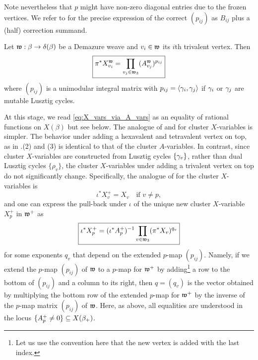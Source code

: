 \noindent Note nevertheless that $p$ might have non-zero diagonal entries due to the frozen vertices. We refer to \cite[Section 8.2]{CGGLSS25} for the precise expression of the correct $(p_{ij})$ as $B_{ij}$ plus a (half) correction summand. \\

\begin{lemma}\label{lem:X_vars_via_A_vars} Let $\mathfrak{w}:\beta\to\delta(\beta)$ be a Demazure weave and $v_i\in\mathfrak{w}$ its $i$th trivalent vertex. Then
\begin{equation}
\label{eq:X_vars_via_A_vars}
\boxed{\pi^*X^{\mathfrak{w}}_{v_i}= \prod_{v_j\in\mathfrak{w}_3} (A^{\mathfrak{w}}_{v_j}) ^{p_{ij}}}
\end{equation}
where $(p_{ij})$ is a unimodular integral matrix with $p_{ij}=\langle\gamma_i,\gamma_j\rangle$ if $\gamma_i$ or $\gamma_j$ are mutable Lusztig cycles.\sbs
\end{lemma}

\noindent At this stage, we read \eqref{eq:X_vars_via_A_vars} as an equality of rational functions on $X(\beta)$ but see  below. The analogue of  and  for cluster $X$-variables is simpler. The behavior under adding a hexavalent and tetravalent vertex on top, as in .(2) and (3) is identical to that of the cluster $A$-variables. In contrast, since cluster $X$-variables are constructed from Lusztig cycles $\{\gamma_v\}$, rather than dual Lusztig cycles $\{\rho_v\}$, the cluster $X$-variables under adding a trivalent vertex on top do not significantly change. Specifically, the analogue of  for the cluster $X$-variables is
\begin{equation}\label{eq:Xvariables_up_new_trivalent}
 \boxed{\iota^*X^+_v=X_v}\quad\mbox{if }v\neq p,
\end{equation}
and one can express the pull-back under $\iota$ of the unique new cluster $X$-variable $X^+_p$ in $\mathfrak{w}^+$ as
$$\boxed{\iota^*X^+_p=(\iota^*A_p^+)^{-1}\prod_{v\in\mathfrak{w}_3}(\pi^*X_v)^{q_v}}$$
for some exponents $q_v$ that depend on the extended $p$-map $(p_{ij})$. Namely, if we extend the $p$-map $(p_{ij})$ of $\mathfrak{w}$ to a $p$-map for $\mathfrak{w}^+$ by adding\footnote{Let us use the convention here that the new vertex is added with the last index.} a row to the bottom of $(p_{ij})$ and a column to its right, then $q=(q_v)$ is the vector obtained by multiplying the bottom row of the extended $p$-map for $\mathfrak{w}^+$ by the inverse of the $p$-map matrix $(p_{ij})$ of $\mathfrak{w}$. Here, as above, all equalities are understood in the locus $\{A_p^+\neq0\}\subseteq X(\beta_+)$.

